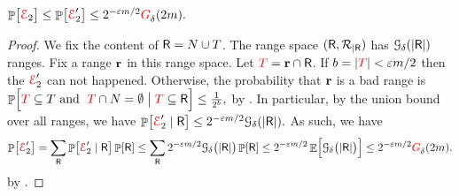 \begin{claim}
    \begin{math}
        \Prob{\bigl. \Event_2} \leq \Prob{ \bigl. \Event_2'}%
        \leq%
        2^{-\eps m /2} \fGrowX{2m}.
    \end{math}
\end{claim}
\begin{proof}
    We fix the content of $\mathsf{R} = N \cup T$. The range space
    $(\mathsf{R}, {\mathcal{R}}_{|\mathsf{R}})$ has
    $\Growth{\Dim}{ \cardin{\Sample}}$ ranges. Fix a range $\mathbf{r}$ in
    this range space. Let ${\textcolor{red}{T}} = \mathbf{r} \cap \mathsf{R}$.  If
    $b = \left| { {\textcolor{red}{T}} } \right| < {\varepsilon} m /2$ then the ${\textcolor{red}{\EuScript{E}}}_2'$ can not
    happened. Otherwise, the probability that $\mathbf{r}$ is a bad range
    is
    \begin{math}
        \Prob{ \Bigl. \SetB \subseteq T \text{ and }\; \SetB \cap N =
           \emptyset \bigm\vert{ \SetB \subseteq \Sample}} \leq
        \frac{1}{2^b},
    \end{math}
    by . In particular, by the union bound over
    all ranges, we have
    \begin{math}
        \Prob{\Event_2' \mid \Sample} %
        \leq 2^{-\eps m /2}  \Growth{\Dim}{ \cardin{\Sample}}.
    \end{math}
    As such, we have
    \begin{align*}
      \Prob{\Event_2'}%
      =%
      \sum_{\Sample}       
      \Prob{\bigl. \Event_2' \mid \Sample} \Prob{\Sample}
      \leq%
      \sum_{\Sample}
      2^{-\eps m /2}  \Growth{\Dim}{\bigl. \cardin{\Sample}}      
      \Prob{\Sample}
      \leq%
      2^{-\eps m /2}
      \Ex{\Bigl.
      \Growth{\Dim}{\bigl. \cardin{\Sample}} }
      \leq%
      2^{-\eps m /2}
      \fGrowX{2m}.
    \end{align*}
    by .
\end{proof}


